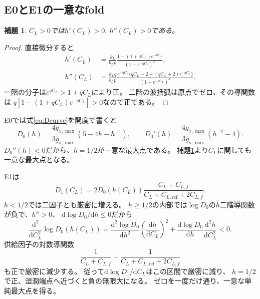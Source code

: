 \documentclass[a4paper,11pt]{ltjsarticle}
\newcommand{\dd}{\mathrm{d}}
\newtheorem{lemma}[proposition]{補題}
\begin{document}
\subsection{E0とE1の一意なfold}
\begin{lemma}\label{lem:opening}
$C_L>0$では$h'(C_L)>0,\ h''(C_L)>0$である。
\end{lemma}
\begin{proof}
直接微分すると
\begin{align}
 h'(C_L)&=\frac{k_L}{b_Lp}\frac{1-(1+qC_L)e^{-qC_L}}{(1-e^{-qC_L})^2},\\
 h''(C_L)&=\frac{k_Lq}{b_Lp}\frac{e^{-qC_L}\{qC_L-2+(qC_L+2)e^{-qC_L}\}}
                      {(1-e^{-qC_L})^3}.
\end{align}
一階の分子は$e^{qC_L}>1+qC_L$により正。
二階の波括弧は原点でゼロ、その導関数は
$q[1-(1+qC_L)e^{-qC_L}]>0$なので正である。
\end{proof}

E0では式\eqref{eq:Dcurve}を開度で書くと
\begin{equation}\label{eq:D0}
 D_0(h)=\frac{4g_{x,\max}}{3g_{s,\max}}(5-4h-h^{-1}),\qquad
 D_0'(h)=\frac{4g_{x,\max}}{3g_{s,\max}}(h^{-2}-4).
\end{equation}
$D_0''(h)<0$だから、$h=1/2$が一意な最大点である。
補題\ref{lem:opening}より$C_L$に関しても一意な最大点となる。

E1は
\begin{equation}\label{eq:D1}
 D_1(C_L)=2D_0(h(C_L))\frac{C_L+C_{L,f}}{C_L+C_{L,\mathrm{ref}}+2C_{L,f}}.
\end{equation}
$h<1/2$では二因子とも厳密に増える。
$h\ge1/2$の内部では$\log D_0$の$h$二階導関数が負で、$h''>0$、
$\dd\log D_0/\dd h\le0$だから
\begin{equation}
 \frac{\dd^2}{\dd C_L^2}\log D_0(h(C_L))
 =\frac{\dd^2\log D_0}{\dd h^2}
   \left(\frac{\dd h}{\dd C_L}\right)^2+
   \frac{\dd\log D_0}{\dd h}\frac{\dd^2h}{\dd C_L^2}<0 .
\end{equation}
供給因子の対数導関数
\begin{equation}
 \frac{1}{C_L+C_{L,f}}-\frac{1}{C_L+C_{L,\mathrm{ref}}+2C_{L,f}}
\end{equation}
も正で厳密に減少する。
従って$\dd\log D_1/\dd C_L$はこの区間で厳密に減り、
$h=1/2$で正、湿潤端点へ近づくと負の無限大になる。
ゼロを一度だけ通り、一意な単純最大点を得る。
\end{document}
